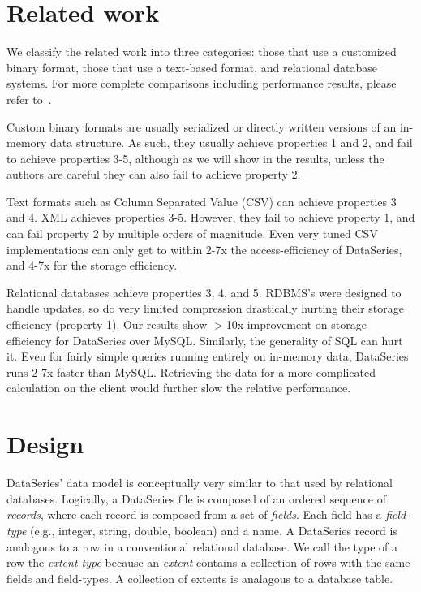 \documentclass{acm_proc_article-sp}
\begin{document}
\section{Related work}\label{sec:related}

We classify the related work into three categories:
those that use a customized binary format, those that use a
text-based format, and relational database systems. 
For more complete comparisons including performance
results, please refer to~\cite{DSTechnicalReportSnapshot}.

Custom binary formats are usually serialized or directly written
versions of an in-memory data structure.  As such, they usually
achieve properties 1 and 2, and fail to achieve properties 3-5,
although as we will show in the results, unless the authors are
careful they can also fail to achieve property 2.

Text formats such as Column Separated Value (CSV) can
achieve properties 3 and 4. XML achieves properties 3-5.  However,
they fail to achieve property 1, and can fail property 2 by multiple
orders of magnitude.  Even very tuned CSV
implementations can only get to within 2-7x the
access-efficiency of DataSeries, and 4-7x for the storage
efficiency.

Relational databases achieve properties 3, 4, and 5. RDBMS's were
designed to handle updates, so do very limited compression drastically
hurting their storage efficiency (property 1).  Our results show
$>$10x improvement on storage efficiency for DataSeries over
MySQL. 
Similarly, the generality of SQL can hurt it.  Even for fairly simple
queries running entirely on in-memory data, DataSeries runs 2-7x
faster than MySQL. 
Retrieving the data for a more complicated
calculation on the client would further slow the relative performance.

\section{Design}\label{sec:design}

DataSeries' data model is conceptually very similar to that used by
relational databases.  Logically, a DataSeries file is composed of an
ordered sequence of {\it records}, where each record is composed from
a set of {\it fields}. Each field has a {\it field-type} (e.g.,
integer, string, double, boolean) and a name. A DataSeries record is
analogous to a row in a conventional relational database. We call the
type of a row the {\it extent-type} because an {\it extent} contains a
collection of rows with the same fields and field-types. A collection
of extents is analagous to a database table.
\end{document}
